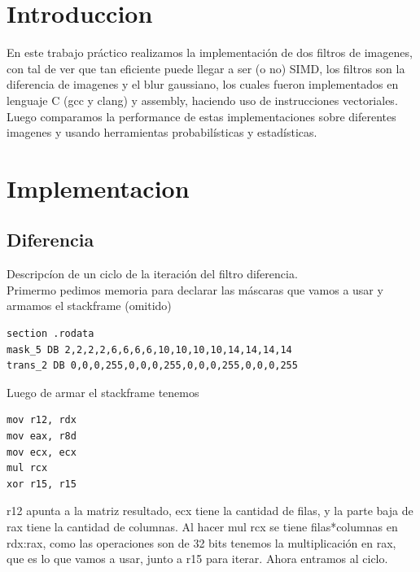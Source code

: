 \documentclass[a4paper]{article}
\begin{document}
\thispagestyle{empty}


\maketitle 

\tableofcontents

\newpage

\section{Introduccion}
En este trabajo práctico realizamos la implementación de dos filtros de imagenes, con tal de ver que tan eficiente puede llegar a ser (o no) SIMD, los filtros son la diferencia de imagenes y el blur gaussiano, los cuales fueron implementados en lenguaje C (gcc y clang) y assembly, haciendo uso de instrucciones vectoriales. Luego comparamos la performance de estas implementaciones sobre diferentes imagenes y usando herramientas probabilísticas y estadísticas.

\section{Implementacion}

\subsection{Diferencia}
\noindent Descripcíon de un ciclo de la iteración del filtro diferencia.\\
Primermo pedimos memoria para declarar las máscaras que vamos a usar y armamos el stackframe (omitido)
\begin{codesnippet}
\begin{verbatim}
section .rodata
mask_5 DB 2,2,2,2,6,6,6,6,10,10,10,10,14,14,14,14
trans_2 DB 0,0,0,255,0,0,0,255,0,0,0,255,0,0,0,255
\end{verbatim}
\end{codesnippet}

\noindent Luego de armar el stackframe tenemos
\begin{codesnippet}
\begin{verbatim}
mov r12, rdx
mov eax, r8d
mov ecx, ecx
mul rcx
xor r15, r15
\end{verbatim}
\end{codesnippet}
r12 apunta a la matriz resultado, ecx tiene la cantidad de filas, y la parte baja de rax tiene la cantidad de columnas. Al hacer mul rcx se tiene filas*columnas en rdx:rax, como las operaciones son de 32 bits tenemos la multiplicación en rax, que es lo que vamos a usar, junto a r15 para iterar. Ahora entramos al ciclo.
\end{document}
